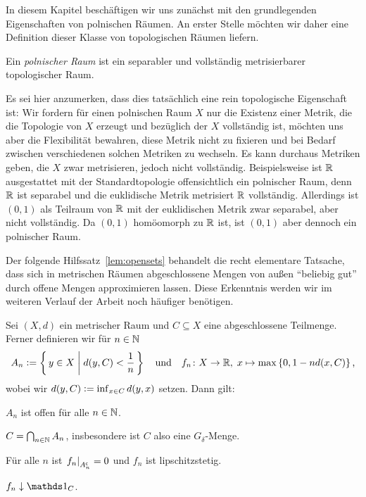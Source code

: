 \documentclass[../main/main.tex]{subfiles}
\begin{document}
	In diesem Kapitel beschäftigen wir uns zunächst mit den grundlegenden Eigenschaften von polnischen Räumen. 
	An erster Stelle möchten wir daher eine Definition dieser Klasse von topologischen Räumen liefern.
	
	\begin{Definition}
		Ein \emph{polnischer Raum} ist ein separabler und vollständig metrisierbarer topologischer Raum.
	\end{Definition}
	
	Es sei hier anzumerken, dass dies tatsächlich eine rein topologische Eigenschaft ist: Wir fordern für einen polnischen Raum $X$ nur die Existenz einer Metrik,
	die die Topologie von $X$ erzeugt und bezüglich der $X$ vollständig ist, möchten uns aber die Flexibilität
	bewahren, diese Metrik nicht zu fixieren und bei Bedarf zwischen verschiedenen solchen Metriken
	zu wechseln. Es kann durchaus Metriken geben, die $X$ zwar metrisieren, jedoch nicht vollständig.
	Beispielsweise ist $\mathbb{R}$ ausgestattet mit der Standardtopologie offensichtlich ein polnischer Raum,
	denn $\mathbb{R}$ ist separabel und die euklidische Metrik metrisiert $\mathbb{R}$ vollständig. 
	Allerdings ist $(0, 1)$ als Teilraum von $\mathbb{R}$ mit der euklidischen Metrik zwar separabel, aber nicht vollständig.
	Da $(0, 1)$ homöomorph zu $\mathbb{R}$ ist, ist $(0, 1)$ aber dennoch ein polnischer Raum.
	
	Der folgende Hilfssatz~\ref{lem:opensets} behandelt die recht elementare Tatsache, dass sich in metrischen Räumen 
	abgeschlossene Mengen von außen \enquote{beliebig gut} durch offene Mengen approximieren lassen. 
	Diese Erkenntnis werden wir im weiteren Verlauf der Arbeit noch häufiger benötigen.
	
	\begin{Hilfssatz}
		\label{lem:opensets}
		Sei $(X, d)$ ein metrischer Raum und $C \subseteq X$ eine abgeschlossene 
		Teilmenge. Ferner definieren wir für $n \in \mathbb{N}$
		$$ A_n \vcentcolon = \left\{\, y \in X \; \middle| \; d(y, C) < \frac{1}{n} \,\right\} \quad \text{und} \quad 
		f_n \colon X \to \mathbb{R}, \; x \mapsto \max \left\{0, 1-n d(x, C)\right\}  \text{,}$$
		wobei wir $d(y, C) \vcentcolon = \inf_{x \in C} d(y, x)$ setzen.
		Dann gilt:
		\begin{enumeratethm}
			\item $A_n$ ist offen für alle $n \in \mathbb{N}$.
			\item $C = \bigcap_{n \in \mathbb{N}} A_n$, insbesondere ist $C$ also eine $G_\delta$-Menge.
			\item Für alle $n$ ist $\left.f_n\right|_{A_n^\mathsf{c}} = 0$ und $f_n$ ist lipschitzstetig.
			\item $f_n \convdown \indfct_C$.
		\end{enumeratethm}
	\end{Hilfssatz}
	
\end{document}
